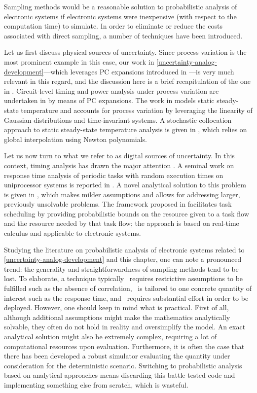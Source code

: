 Sampling methods would be a reasonable solution to probabilistic analysis of
electronic systems if electronic systems were inexpensive (with respect to the
computation time) to simulate. In order to eliminate or reduce the costs
associated with direct sampling, a number of techniques have been introduced.

Let us first discuss physical sources of uncertainty. Since process variation is
the most prominent example in this case, our work in
\cref{uncertainty-analog-development}---which leverages \ac{PC} expansions
\cite{xiu2010} introduced in ---is very much relevant in
this regard, and the discussion here is a brief recapitulation of the one in
. Circuit-level timing and power analysis under process
variation are undertaken in \cite{bhardwaj2008} by means of \ac{PC} expansions.
The work in \cite{juan2012} models static steady-state temperature and accounts
for process variation by leveraging the linearity of Gaussian distributions and
time-invariant systems. A stochastic collocation \cite{xiu2010} approach to
static steady-state temperature analysis is given in \cite{lee2013}, which
relies on global interpolation using Newton polynomials.

Let us now turn to what we refer to as digital sources of uncertainty. In this
context, timing analysis has drawn the major attention \cite{quinton2012}. A
seminal work on response time analysis of periodic tasks with random execution
times on uniprocessor systems is reported in \cite{diaz2002}. A novel analytical
solution to this problem is given in \cite{tanasa2015}, which makes milder
assumptions and allows for addressing larger, previously unsolvable problems.
The framework proposed in \cite{santinelli2011} facilitates task scheduling by
providing probabilistic bounds on the resource given to a task flow and the
resource needed by that task flow; the approach is based on real-time calculus
and applicable to electronic systems.

Studying the literature on probabilistic analysis of electronic systems related
to \cref{uncertainty-analog-development} and this chapter, one can note a
pronounced trend: the generality and straightforwardness of sampling methods
tend to be lost. To elaborate, a technique typically \one~requires restrictive
assumptions to be fulfilled such as the absence of correlation, \two~is tailored
to one concrete quantity of interest such as the response time, and
\three~requires substantial effort in order to be deployed. However, one should
keep in mind what is practical. First of all, although additional assumptions
might make the mathematics analytically solvable, they often do not hold in
reality and oversimplify the model. An exact analytical solution might also be
extremely complex, requiring a lot of computational resources upon evaluation.
Furthermore, it is often the case that there has been developed a robust
simulator evaluating the quantity under consideration for the deterministic
scenario. Switching to probabilistic analysis based on analytical approaches
means discarding this battle-tested code and implementing something else from
scratch, which is wasteful.

